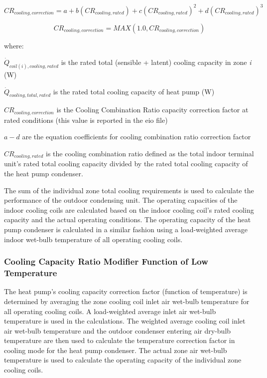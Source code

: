 \begin{equation}
C{R_{cooling,correction}} = a + b\left( {C{R_{cooling,rated}}} \right) + c{\left( {C{R_{cooling,rated}}} \right)^2} + d{\left( {C{R_{cooling,rated}}} \right)^3}
\end{equation}

\begin{equation}
C{R_{cooling,correction}} = MAX\left( {1.0,C{R_{cooling,correction}}} \right)
\end{equation}

where:

\({\dot{Q}_{coil(i),cooling,rated}}\) is the rated total (sensible + latent) cooling capacity in zone \emph{i} (W)

\({\dot{Q}_{cooling,total,rated}}\) is the rated total cooling capacity of heat pump (W)

\(C{R_{cooling,correction}}\) is the Cooling Combination Ratio capacity correction factor at rated conditions (this value is reported in the eio file)

\(a - d\) are the equation coefficients for cooling combination ratio correction factor

\(C{R_{cooling,rated}}\) is the cooling combination ratio defined as the total indoor terminal unit's rated total cooling capacity divided by the rated total cooling capacity of the heat pump condenser.

The sum of the individual zone total cooling requirements is used to calculate the performance of the outdoor condensing unit. The operating capacities of the indoor cooling coils are calculated based on the indoor cooling coil's rated cooling capacity and the actual operating conditions. The operating capacity of the heat pump condenser is calculated in a similar fashion using a load-weighted average indoor wet-bulb temperature of all operating cooling coils.

\subsubsection{Cooling Capacity Ratio Modifier Function of Low Temperature}\label{cooling-capacity-ratio-modifier-function-of-low-temperature}

The heat pump's cooling capacity correction factor (function of temperature) is determined by averaging the zone cooling coil inlet air wet-bulb temperature for all operating cooling coils. A load-weighted average inlet air wet-bulb temperature is used in the calculations. The weighted average cooling coil inlet air wet-bulb temperature and the outdoor condenser entering air dry-bulb temperature are then used to calculate the temperature correction factor in cooling mode for the heat pump condenser. The actual zone air wet-bulb temperature is used to calculate the operating capacity of the individual zone cooling coils.

